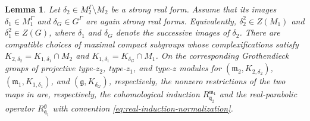 \documentclass[10pt]{amsart}
\numberwithin{equation}{section}
\theoremstyle{plain}
\newtheorem{lemma}[proposition]{Lemma}
\theoremstyle{definition}
\theoremstyle{remark}
\newcommand{\fg}{\mathfrak g}
\newcommand{\fm}{\mathfrak m}
\newcommand{\fq}{\mathfrak q}
\begin{document}
\begin{lemma}\label{lem:fixed-pair}
Let $\delta_2\in M_2^\Gamma\setminus M_2$ be a strong real form. Assume
that its images $\delta_1\in M_1^\Gamma$ and
$\delta_G\in G^\Gamma$ are again strong real forms. Equivalently,
$\delta_2^2\in Z(M_1)$ and $\delta_1^2\in Z(G)$, where $\delta_1$ and
$\delta_G$ denote the successive images of
$\delta_2$.
There are compatible choices of maximal compact subgroups whose
complexifications satisfy $K_{2,\delta_2}=K_{1,\delta_1}\cap M_2$ and
$K_{1,\delta_1}=K_{\delta_G}\cap M_1$.
On the corresponding Grothendieck groups of projective type-$z_2$,
type-$z_1$, and type-$z$ modules for
$(\fm_2,K_{2,\delta_2})$, $(\fm_1,K_{1,\delta_1})$, and
$(\fg,K_{\delta_G})$, respectively, the nonzero restrictions of the two maps in
\cite[(2.6.1)]{AIMV26} are, respectively, the cohomological induction
$R_{\fq_2}^{\fm_1}$ and the real-parabolic operator
$R_{\fq_1}^{\fg}$ with convention \eqref{eq:real-induction-normalization}.
\end{lemma}
\end{document}
